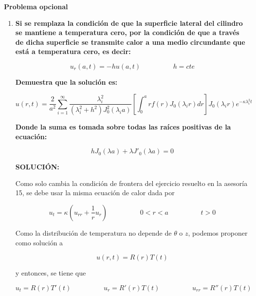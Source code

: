 \documentclass[12pt,a4paper]{article}
\begin{document}
\textbf{Problema opcional}

\begin{enumerate}
    \item \textbf{Si se remplaza la condición de que la superficie lateral del cilindro se mantiene a temperatura cero, por la condición de que a través de dicha superficie se transmite calor a una medio circundante que está a temperatura cero, es decir:}
    
    \begin{equation*}
     u_{r}(a,t) =-hu(a,t)  \hspace{2cm} h =cte    
    \end{equation*}
    
    \textbf{Demuestra que la solución es:}
    
    \begin{equation*}
        u(r,t)= \frac{2}{a^2} \sum_{i=1}^{\infty} \frac{\lambda_{i}^{2}}{(\lambda_{i}^{2} + h^2)J_0^2(\lambda_i a)}\left[\int_{0}^{a} rf(r)J_0(\lambda_i r)dr\right] J_0(\lambda_i r) e^{-\kappa \lambda_i^{2}t}
    \end{equation*}
    
    \textbf{Donde la suma es tomada sobre todas las raíces positivas de la ecuación:}
    
    \begin{equation*}
        h J_0(\lambda a)+ \lambda J'_0(\lambda a )=0
    \end{equation*}
    
    
    \textbf{SOLUCIÓN:}
    
    Como solo cambia la condición de frontera del ejercicio resuelto en la asesoría 15, se debe usar la misma ecuación de calor dada por
    
    \begin{equation*}
        u_{t}= \kappa (u_{rr} + \frac{1}{r}u_r) \hspace{2cm} 0 < r< a \hspace{2cm} t>0 
    \end{equation*}
    
    Como la distribución de temperatura no depende de $\theta$ o $z$, podemos proponer como solución a
    
    \begin{equation*}
        u(r,t)= R(r)T(t)
    \end{equation*}
    
    y entonces, se tiene que
    
    \begin{equation*}
        u_t= R(r)T'(t) \hspace{2cm} u_r=R'(r)T(t) \hspace{2cm} u_{rr} = R''(r)T(t)
    \end{equation*}
    

\end{enumerate}
\end{document}
